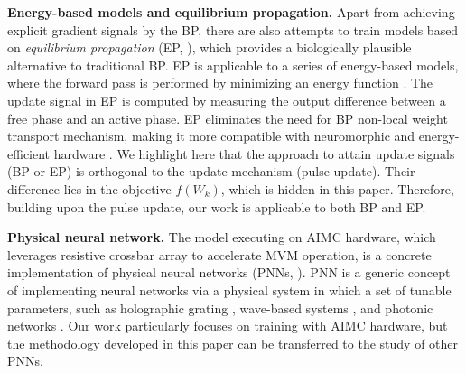 \textbf{Energy-based models and equilibrium propagation.}
Apart from achieving explicit gradient signals by the BP, there are also attempts to train models based on \emph{equilibrium propagation} (EP, \cite{scellier2017equilibrium}), which provides a biologically plausible alternative to traditional BP. EP is applicable to a series of energy-based models, where the forward pass is performed by minimizing an energy function \citep{watfa2023energy, scellier2024energy}. The update signal in EP is computed by measuring the output difference between a free phase and an active phase. EP eliminates the need for BP non-local weight transport mechanism, making it more compatible with neuromorphic and energy-efficient hardware \citep{kendall2020training, ernoult2020equilibrium}. We highlight here that the approach to attain update signals (BP or EP) is orthogonal to the update mechanism (pulse update). Their difference lies in the objective $f(W_k)$, which is hidden in this paper. Therefore, building upon the pulse update, our work is applicable to both BP and EP.

\textbf{Physical neural network.}
The model executing on AIMC hardware, which leverages resistive crossbar array to accelerate MVM operation, is a concrete implementation of physical neural networks (PNNs, \cite{wright2022deep, momeni2024training}). 
PNN is a generic concept of implementing neural networks via a physical system in which a set of tunable parameters, such as holographic grating \citep{psaltis1990holography}, wave-based systems \citep{hughes2019wave}, and photonic networks \citep{tait2017neuromorphic}. Our work particularly focuses on training with AIMC hardware, but the methodology developed in this paper can be transferred to the study of other PNNs.